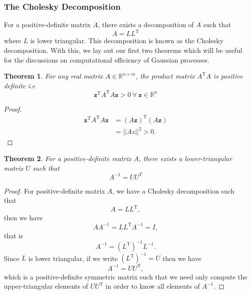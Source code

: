 \documentclass[10pt,a4paper]{article}
\numberwithin{equation}{section}
\theoremstyle{plain}
\newtheorem{thm}{Theorem}
\theoremstyle{own}
\begin{document}
\subsubsection{The Cholesky Decomposition}
For a positive-definite matrix $A$, there exists a decomposition of $A$ such that
\begin{equation}
A = LL^{\text{T}}
\end{equation}
where $L$ is lower triangular. This decomposition is known as the Cholesky decomposition. With this, we lay out our first two theorems which will be useful for the discussions on computational efficiency of Gaussian processes.

\begin{thm} \label{posdef}
For any real matrix $A \in \mathbb{R}^{n \times m}$, the product matrix $A^{\text{T}}A$ is positive definite i.e
\begin{equation}
\mathbf{z}^{\text{T}} A^{\text{T}}A \mathbf{z} > 0 ~ \forall ~ \mathbf{z} \in \mathbb{R}^{n}
\end{equation}
\end{thm}
\begin{proof}
\begin{align} \nonumber
\mathbf{z}^{\text{T}} A^{\text{T}}A \mathbf{z} & = (A \mathbf{z})^{\text{T}} (A \mathbf{z}) \\
& = || Az ||^2 > 0.
\end{align}
\end{proof}
\begin{thm} \label{posdef2}
For a positive-definite matrix $A$, there exists a lower-triangular matrix $U$ such that
\begin{equation}
A^{-1} = U U^{T}
\end{equation}
\end{thm}
\begin{proof}
For positive-definite matrix $A$, we have a Cholesky decomposition such that
\begin{equation}
A = L L^{\text{T}},
\end{equation}
then we have
\begin{equation}
A A^{-1} = L L^{\text{T}} A^{-1} = I,
\end{equation}
that is
\begin{equation}
A^{-1} = ( L^{\text{T}} )^{-1} L^{-1}.
\end{equation}
Since $L$ is lower triangular, if we write $( L^{\text{T}} )^{-1} = U$ then we have
\begin{equation}
A^{-1} = U U^{\text{T}},
\end{equation}
which is a positive-definite symmetric matrix such that we need only compute the upper-triangular elements of $U U^{\text{T}}$ in order to know all elements of $A^{-1}$.
\end{proof}
\pagebreak
\end{document}
